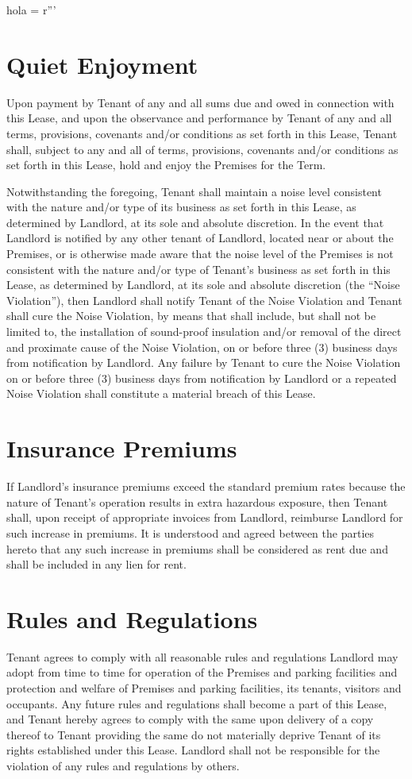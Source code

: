 hola = r'''\documentclass{article}
\begin{document}
\section{Quiet Enjoyment}
    Upon payment by Tenant of any and all sums due and owed in connection with this Lease, and upon the observance and performance by Tenant of any and all terms, provisions, covenants and/or conditions as set forth in this Lease, Tenant shall, subject to any and all of terms, provisions, covenants and/or conditions as set forth in this Lease, hold and enjoy the Premises for the Term.  

    Notwithstanding the foregoing, Tenant shall maintain a noise level consistent with the nature and/or type of its business as set forth in this Lease, as determined by Landlord, at its sole and absolute discretion.  In the event that Landlord is notified by any other tenant of Landlord, located near or about the Premises, or is otherwise made aware that the noise level of the Premises is not consistent with the nature and/or type of Tenant’s business as set forth in this Lease, as determined by Landlord, at its sole and absolute discretion (the “Noise Violation”), then Landlord shall notify Tenant of the Noise Violation and Tenant shall cure the Noise Violation, by means that shall include, but shall not be limited to, the installation of sound-proof insulation and/or removal of the direct and proximate cause of the Noise Violation, on or before three (3) business days from notification by Landlord.  Any failure by Tenant to cure the Noise Violation on or before three (3) business days from notification by Landlord or a repeated Noise Violation shall constitute a material breach of this Lease.

\section{Insurance Premiums}
    If Landlord's insurance premiums exceed the standard premium rates because the nature of Tenant's operation results in extra hazardous exposure, then Tenant shall, upon receipt of appropriate invoices from Landlord, reimburse Landlord for such increase in premiums. It is understood and agreed between the parties hereto that any such increase in premiums shall be considered as rent due and shall be included in any lien for rent.

\section{Rules and Regulations}
    Tenant agrees to comply with all reasonable rules and regulations Landlord may adopt from time to time for operation of the Premises and parking facilities and protection and welfare of Premises and parking facilities, its tenants, visitors and occupants. Any future rules and regulations shall become a part of this Lease, and Tenant hereby agrees to comply with the same upon delivery of a copy thereof to Tenant providing the same do not materially deprive Tenant of its rights established under this Lease.  Landlord shall not be responsible for the violation of any rules and regulations by others. 
\end{document}
